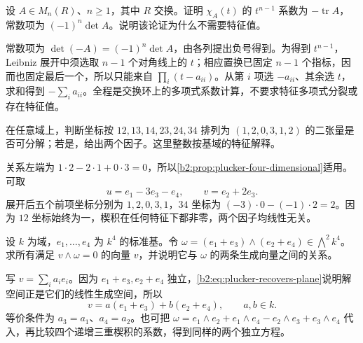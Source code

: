 \begin{exercise}\label{b2:ex:09-characteristic-coefficients}
	设 \(A\in M_n(R)\)、\(n\ge1\)，其中 \(R\) 交换。证明 \(\chi_A(t)\) 的 \(t^{n-1}\) 系数为 \(-\operatorname{tr}A\)，常数项为 \((-1)^n\det A\)。说明该论证为什么不需要特征值。
\end{exercise}
\begin{solution}
	常数项为 \(\det(-A)=(-1)^n\det A\)，由各列提出负号得到。为得到 \(t^{n-1}\)，Leibniz 展开中须选取 \(n-1\) 个对角线上的 \(t\)；相应置换已固定 \(n-1\) 个指标，因而也固定最后一个，所以只能来自 \(\prod_i(t-a_{ii})\)。从第 \(i\) 项选 \(-a_{ii}\)、其余选 \(t\)，求和得到 \(-\sum_i a_{ii}\)。全程是交换环上的多项式系数计算，不要求特征多项式分裂或存在特征值。
\end{solution}

\begin{exercise}\label{b2:ex:09-plucker-explicit}
	在任意域上，判断坐标按 \(12,13,14,23,24,34\) 排列为 \((1,2,0,3,1,2)\) 的二张量是否可分解；若是，给出两个因子。这里整数按基域的特征解释。
\end{exercise}
\begin{solution}
	关系左端为 \(1\cdot2-2\cdot1+0\cdot3=0\)，所以\cref{b2:prop:plucker-four-dimensional}适用。可取
	\[
		u=e_1-3e_3-e_4,\qquad v=e_2+2e_3.
	\]
	展开后五个前项坐标分别为 \(1,2,0,3,1\)，\(34\) 坐标为 \((-3)\cdot0-(-1)\cdot2=2\)。因为 \(12\) 坐标始终为一，楔积在任何特征下都非零，两个因子均线性无关。
\end{solution}

\begin{exercise}\label{b2:ex:09-plucker-plane-recovery}
	设 \(k\) 为域，\(e_1,\ldots,e_4\) 为 \(k^4\) 的标准基。令 \(\omega=(e_1+e_3)\wedge(e_2+e_4)\in\bigwedge^2k^4\)。求所有满足 \(v\wedge\omega=0\) 的向量 \(v\)，并说明它与 \(\omega\) 的两条生成向量之间的关系。
\end{exercise}
\begin{solution}
	写 \(v=\sum_i a_ie_i\)。因为 \(e_1+e_3,e_2+e_4\) 独立，\eqref{b2:eq:plucker-recovers-plane}说明解空间正是它们的线性生成空间，所以
	\[
		v=a(e_1+e_3)+b(e_2+e_4),\qquad a,b\in k.
	\]
	等价条件为 \(a_3=a_1\)、\(a_4=a_2\)。也可把 \(\omega=e_1\wedge e_2+e_1\wedge e_4-e_2\wedge e_3+e_3\wedge e_4\) 代入，再比较四个递增三重楔积的系数，得到同样的两个独立方程。
\end{solution}

